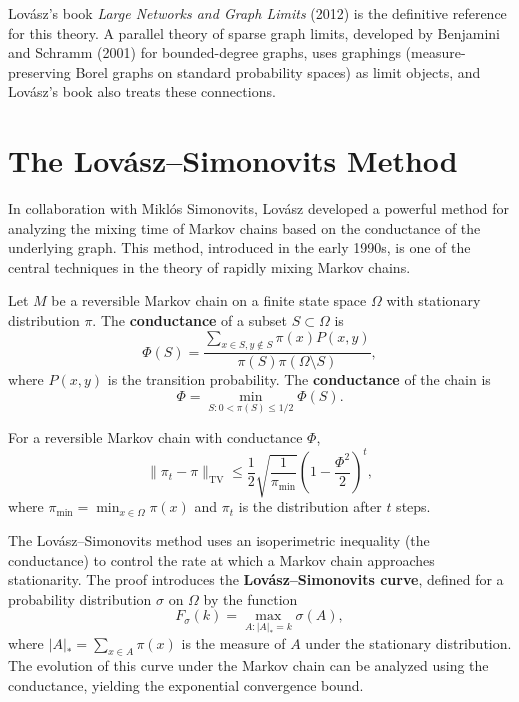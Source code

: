 Lov\'{a}sz's book \textit{Large Networks and Graph Limits} (2012) is the definitive reference for this theory. A parallel theory of sparse graph limits, developed by Benjamini and Schramm (2001) for bounded-degree graphs, uses graphings (measure-preserving Borel graphs on standard probability spaces) as limit objects, and Lov\'{a}sz's book also treats these connections.

\section{The Lov\'{a}sz--Simonovits Method}

In collaboration with Mikl\'{o}s Simonovits, Lov\'{a}sz developed a powerful method for analyzing the mixing time of Markov chains based on the conductance of the underlying graph. This method, introduced in the early 1990s, is one of the central techniques in the theory of rapidly mixing Markov chains.

\begin{definition}[Conductance]
Let \(M\) be a reversible Markov chain on a finite state space \(\Omega\) with stationary distribution \(\pi\). The \textbf{conductance} of a subset \(S \subset \Omega\) is
\[
\Phi(S) = \frac{\sum_{x \in S, y \notin S} \pi(x) P(x,y)}{\pi(S) \pi(\Omega \setminus S)},
\]
where \(P(x,y)\) is the transition probability. The \textbf{conductance} of the chain is
\[
\Phi = \min_{S: 0 < \pi(S) \leq 1/2} \Phi(S).
\]
\end{definition}

\begin{theorem}
For a reversible Markov chain with conductance \(\Phi\),
\[
\|\pi_t - \pi\|_{\text{TV}} \leq \frac{1}{2} \sqrt{\frac{1}{\pi_{\min}}} \left(1 - \frac{\Phi^2}{2}\right)^t,
\]
where \(\pi_{\min} = \min_{x \in \Omega} \pi(x)\) and \(\pi_t\) is the distribution after \(t\) steps.
\end{theorem}

The Lov\'{a}sz--Simonovits method uses an isoperimetric inequality (the conductance) to control the rate at which a Markov chain approaches stationarity. The proof introduces the \textbf{Lov\'{a}sz--Simonovits curve}, defined for a probability distribution \(\sigma\) on \(\Omega\) by the function
\[
F_\sigma(k) = \max_{A: |A|_* = k} \sigma(A),
\]
where \(|A|_* = \sum_{x \in A} \pi(x)\) is the measure of \(A\) under the stationary distribution. The evolution of this curve under the Markov chain can be analyzed using the conductance, yielding the exponential convergence bound.

